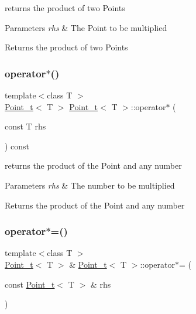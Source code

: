 returns the product of two Points 


\begin{DoxyParams}{Parameters}
{\em rhs} & The Point to be multiplied\\
\hline
\end{DoxyParams}
\begin{DoxyReturn}{Returns}
the product of two Points 
\end{DoxyReturn}
\mbox{\label{class_point__t_a6e2924110e74cc78027171765fb3eb84}} 
\subsubsection{\texorpdfstring{operator$\ast$()}{operator*()}\hspace{0.1cm}{\footnotesize\ttfamily [2/2]}}
{\footnotesize\ttfamily template$<$class T $>$ \\
\hyperlink{class_point__t}{Point\+\_\+t}$<$ T $>$ \hyperlink{class_point__t}{Point\+\_\+t}$<$ T $>$\+::operator$\ast$ (\begin{DoxyParamCaption}\item[{const T}]{rhs }\end{DoxyParamCaption}) const}



returns the product of the Point and any number 


\begin{DoxyParams}{Parameters}
{\em rhs} & The number to be multiplied\\
\hline
\end{DoxyParams}
\begin{DoxyReturn}{Returns}
the product of the Point and any number 
\end{DoxyReturn}
\mbox{\label{class_point__t_aefb9c2d617458a15d475690641e51b37}} 
\subsubsection{\texorpdfstring{operator$\ast$=()}{operator*=()}\hspace{0.1cm}{\footnotesize\ttfamily [1/2]}}
{\footnotesize\ttfamily template$<$class T $>$ \\
\hyperlink{class_point__t}{Point\+\_\+t}$<$ T $>$ \& \hyperlink{class_point__t}{Point\+\_\+t}$<$ T $>$\+::operator$\ast$= (\begin{DoxyParamCaption}\item[{const \hyperlink{class_point__t}{Point\+\_\+t}$<$ T $>$ \&}]{rhs }\end{DoxyParamCaption})}



